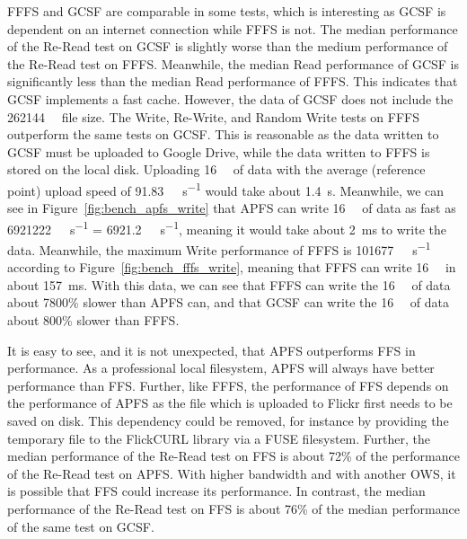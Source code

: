 \gls{FFFS} and \gls{GCSF} are comparable in some tests, which is interesting as \gls{GCSF} is dependent on an internet connection while \gls{FFFS} is not. The median performance of the \mbox{Re-Read} test on \gls{GCSF} is slightly worse than the medium performance of the \mbox{Re-Read} test on \gls{FFFS}. Meanwhile, the median Read performance of \gls{GCSF} is significantly less than the median Read performance of \gls{FFFS}. This indicates that \gls{GCSF} implements a fast cache. However, the data of \gls{GCSF} does not include the \SI{262144}{\kilo\byte} file size. The Write, \mbox{Re-Write}, and Random Write tests on \gls{FFFS} outperform the same tests on \gls{GCSF}. This is reasonable as the data written to \gls{GCSF} must be uploaded to Google Drive, while the data written to \gls{FFFS} is stored on the local disk. Uploading \SI{16}{\mega\byte} of data with the average (reference point) upload speed of \SI[per-mode = symbol]{91.83}{\mega\bit\per\second} would take about \SI{1.4}{\second}. Meanwhile, we can see in Figure~\ref{fig:bench_apfs_write} that \gls{APFS} can write \SI{16}{\mega\byte} of data as fast as \SI[per-mode = symbol]{6921222}{\kilo\byte\per\second} = \SI[per-mode = symbol]{6921.2}{\mega\byte\per\second}, meaning it would take about \SI{2}{\milli\second} to write the data. Meanwhile, the maximum Write performance of \gls{FFFS} is \SI[per-mode = symbol]{101677}{\kilo\byte\per\second} according to Figure~\ref{fig:bench_fffs_write}, meaning that \gls{FFFS} can write \SI{16}{\mega\byte} in about \SI{157}{\milli\second}. With this data, we can see that \gls{FFFS} can write the \SI{16}{\mega\byte} of data about 7800\% slower than \gls{APFS} can, and that \gls{GCSF} can write the \SI{16}{\mega\byte} of data about 800\% slower than \gls{FFFS}. 

It is easy to see, and it is not unexpected, that \gls{APFS} outperforms \gls{FFS} in performance. As a professional local filesystem, \gls{APFS} will always have better performance than FFS. Further, like \gls{FFFS}, the performance of \gls{FFS} depends on the performance of \gls{APFS} as the file which is uploaded to Flickr first needs to be saved on disk. This dependency could be removed, for instance by providing the temporary file to the FlickCURL library via a \gls{FUSE} filesystem. Further, the median performance of the \mbox{Re-Read} test on \gls{FFS} is about 72\% of the performance of the \mbox{Re-Read} test on \gls{APFS}. With higher bandwidth and with another \gls{OWS}, it is possible that \gls{FFS} could increase its performance. In contrast, the median performance of the \mbox{Re-Read} test on \gls{FFS} is about 76\% of the median performance of the same test on \gls{GCSF}.